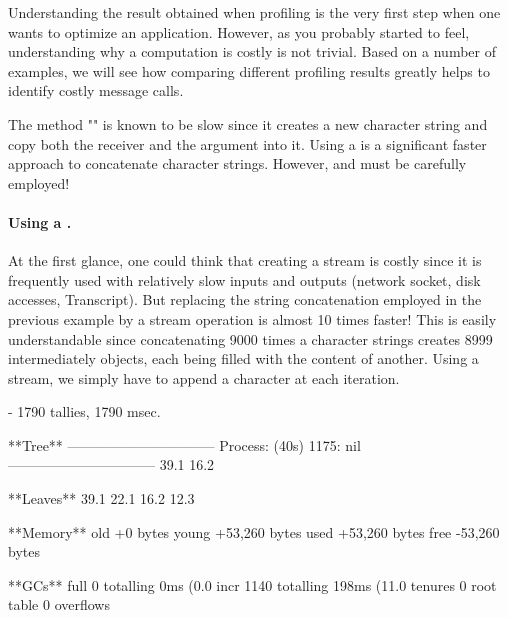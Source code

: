 \documentclass[a4paper,10pt,twoside]{book}
\begin{document}
Understanding the result obtained when profiling is the very first step when one wants to optimize an application. However, as you probably started to feel, understanding why a computation is costly is not trivial. Based on a number of examples, we will see how comparing different profiling results greatly helps to identify costly message calls. 

The method "\ct{,}" is known to be slow since it creates a new character string and copy both the receiver and the argument into it. Using a  is a significant faster approach to concatenate character strings. However,  and  must be carefully employed!


\paragraph{Using a .}
At the first glance, one could think that creating a stream is costly since it is frequently used with relatively slow inputs and outputs (\eg network socket, disk accesses, Transcript). But replacing the string concatenation employed in the previous example by a stream operation is almost 10 times faster! This is easily understandable since concatenating 9000 times a character strings creates 8999 intermediately objects, each being filled with the content of another. Using a stream, we simply have to append a character at each iteration.


\begin{code}{}
 - 1790 tallies, 1790 msec.

**Tree**
--------------------------------
Process: (40s)  1175: nil
--------------------------------
39.1%
16.2%

**Leaves**
39.1%
22.1%
16.2%
12.3%

**Memory**
	old			+0 bytes
	young		+53,260 bytes
	used		+53,260 bytes
	free		-53,260 bytes

**GCs**
	full			0 totalling 0ms (0.0%
	incr		1140 totalling 198ms (11.0%
	tenures		0
	root table	0 overflows
\end{code}
\end{document}
